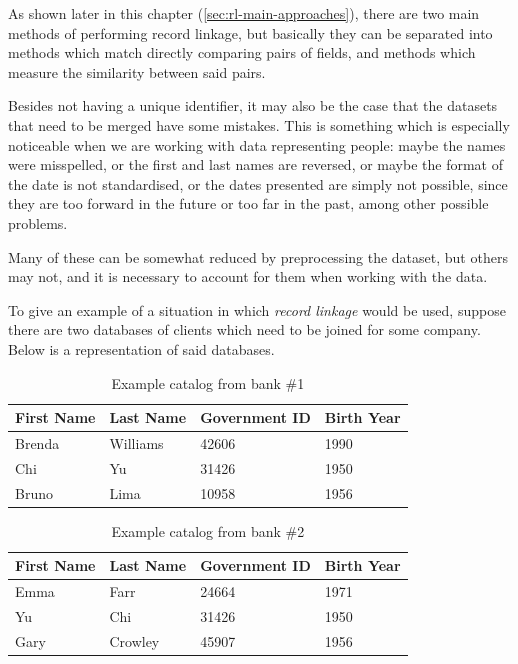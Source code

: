 \documentclass[epsfig,a4paper,11pt,titlepage,twoside,openany]{book}
\begin{document}
As shown later in this chapter (\autoref{sec:rl-main-approaches}), there are two main methods of performing record linkage, but basically they can be separated into methods which match directly comparing pairs of fields, and methods which measure the similarity between said pairs.

Besides not having a unique identifier, it may also be the case that the datasets that need to be merged have some mistakes. This is something which is especially noticeable when we are working with data representing people: maybe the names were misspelled, or the first and last names are reversed, or maybe the format of the date is not standardised, or the dates presented are simply not possible, since they are too forward in the future or too far in the past, among other possible problems. 

Many of these can be somewhat reduced by preprocessing the dataset, but
others may not, and it is necessary to account for them when working with the data.


To give an example of a situation in which \textit{record linkage} would be used,
suppose there are two databases of clients which need to be joined for some company. Below is a representation of said databases.

\begin{table}[H]
  \centering{}
  \begin{tabular}{l|l|l|l}
    First Name & Last Name & Government ID & Birth Year \\ \hline
    Brenda     & Williams  & 42606         & 1990       \\
    Chi        & Yu        & 31426         & 1950       \\
    Bruno      & Lima      & 10958         & 1956      
  \end{tabular}
  \caption{Example catalog from bank \#1}
  \label{tab:ex-catalog-1}
\end{table}


\begin{table}[H]
  \centering{}
  \begin{tabular}{l|l|l|l}
    First Name & Last Name & Government ID & Birth Year \\ \hline
    Emma       & Farr      & 24664         & 1971       \\
    Yu         & Chi       & 31426         & 1950       \\
    Gary       & Crowley   & 45907         & 1956      
  \end{tabular}
  \caption{Example catalog from bank \#2}
  \label{tab:ex-catalog-2}
\end{table}
\end{document}
